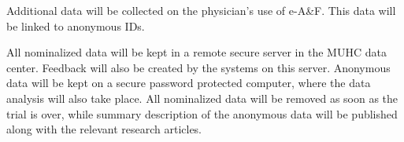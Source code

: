 Additional data will be collected on the physician's use of e-A\&F. This data will be linked to anonymous IDs.

All nominalized data will be kept in a remote secure server in the MUHC data center. Feedback will also be created by the systems on this server. Anonymous data will be kept on a secure password protected computer, where the data analysis will also take place. All nominalized data will be removed as soon as the trial is over, while summary description of the anonymous data will be published along with the relevant research articles.